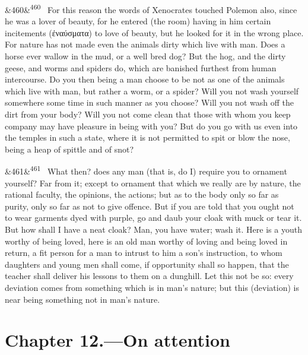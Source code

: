 \documentclass[12pt]{article}
\newcommand{\para}[1][]{\par\noindent\ifx&#1&\else\textsuperscript{\footnotesize #1}~\fi}
\begin{document}
\para[460] For this reason the words of Xenocrates touched Polemon also, since he was a lover of beauty, for he entered (the room) having in him certain incitements (ἐναύσματα) to love of beauty, but he looked for it in the wrong place. For nature has not made even the animals dirty which live with man. Does a horse ever wallow in the mud, or a well bred dog? But the hog, and the dirty geese, and worms and spiders do, which are banished furthest from human intercourse. Do you then being a man choose to be not as one of the animals which live with man, but rather a worm, or a spider? Will you not wash yourself somewhere some time in such manner as you choose? Will you not wash off the dirt from your body? Will you not come clean that those with whom you keep company may have pleasure in being with you? But do you go with us even into the temples in such a state, where it is not permitted to spit or blow the nose, being a heap of spittle and of snot?

\para[461] What then? does any man (that is, do I) require you to ornament yourself? Far from it; except to ornament that which we really are by nature, the rational faculty, the opinions, the actions; but as to the body only so far as purity, only so far as not to give offence. But if you are told that you ought not to wear garments dyed with purple, go and daub your cloak with muck or tear it. But how shall I have a neat cloak? Man, you have water; wash it. Here is a youth worthy of being loved, here is an old man worthy of loving and being loved in return, a fit person for a man to intrust to him a son's instruction, to whom daughters and young men shall come, if opportunity shall so happen, that the teacher shall deliver his lessons to them on a dunghill. Let this not be so: every deviation comes from something which is in man's nature; but this (deviation) is near being something not in man's nature.

\section*{Chapter 12.---On attention}
\end{document}

